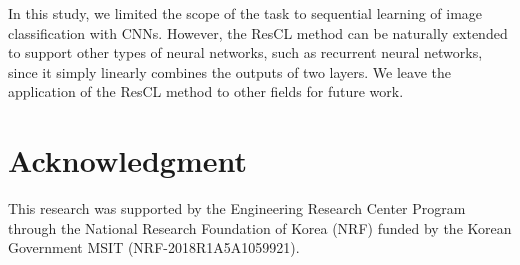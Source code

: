 \documentclass[letterpaper]{article}
\begin{document}
In this study, we limited the scope of the task to sequential learning of image classification with CNNs. However, the ResCL method can be naturally extended to support other types of neural networks, such as recurrent neural networks, since it simply linearly combines the outputs of two layers. We leave the application of the ResCL method to other fields for future work.


\section{Acknowledgment}

This research was supported by the Engineering Research Center Program through the National Research Foundation of Korea (NRF) funded by the Korean Government MSIT (NRF-2018R1A5A1059921).




\end{document}

